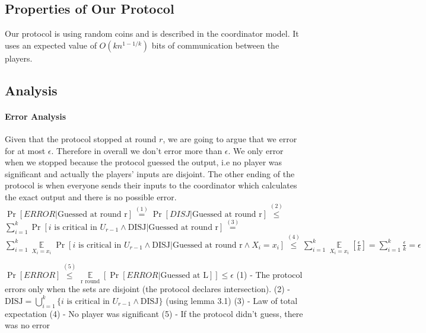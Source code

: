 \documentclass{article}
\theoremstyle{plain}
\begin{document}
\subsection{Properties of Our Protocol}
Our protocol is using random coins and is described in the coordinator model. It uses an expected value of $O(kn^{1-1/k})$ bits of communication between the players.
\subsection{Analysis}
\paragraph{Error Analysis}
Given that the protocol stopped at round $r$, we are going to argue that we error for at most $\epsilon$. Therefore in overall we don't error more than $\epsilon$.
We only error when we stopped because the protocol guessed the output, i.e no player was significant and actually the players' inputs are disjoint. The other ending of the protocol is when everyone sends their inputs to the coordinator which calculates the exact output and there is no possible error. \newline
$\Pr[ERROR | \text{Guessed at round r}] \overset{(1)}{=} \Pr[DISJ | \text{Guessed at round r}] \overset{(2)}{\leq} $\newline
$\sum\limits_{i=1}^k \Pr[\text{$i$ is critical in $U_{r-1}$} \land \text{DISJ}| \text{Guessed at round r}] \overset{(3)}{=} $ \newline
$\sum\limits_{i=1}^k \underset{X_i=x_i}{\mathop{\mathbb{E}}}\Pr[\text{$i$ is critical in $U_{r-1}$} \land \text{DISJ}| \text{Guessed at round r} \land X_i=x_i] \overset{(4)}{\leq} \sum\limits_{i=1}^k \underset{X_i=x_i}{\mathop{\mathbb{E}}}[\frac{\epsilon}{k}] = \sum\limits_{i=1}^k \frac{\epsilon}{k} = \epsilon$ \newline

$\Pr[ERROR] \overset{(5)}{\leq} \underset{\text{r round}}{\mathop{\mathbb{E}}} [\Pr[ERROR | \text{Guessed at L}] ] \leq \epsilon $ \newline
(1) - The protocol errors only when the sets are disjoint (the protocol declares intersection). \newline
(2) - $  \text{DISJ} = \bigcup_{i=1}^{k}\{\text{$i$ is critical in $U_{r-1}$} \land \text{DISJ} \} $ (using lemma 3.1) \newline
(3) - Law of total expectation \newline
(4) - No player was significant \newline
(5) - If the protocol didn't guess, there was no error
\end{document}
